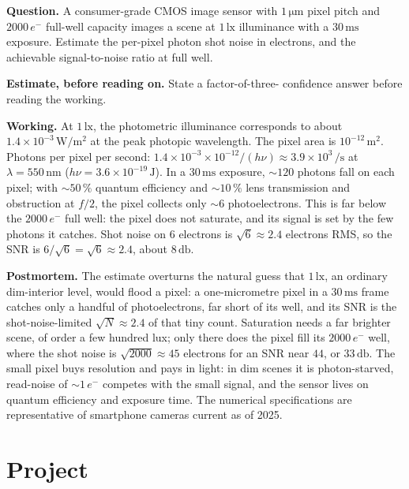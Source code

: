 \begin{estimation}
\textbf{Question.} A consumer-grade CMOS image sensor with $1\,\si{
\micro\meter}$ pixel pitch and $2000\,e^{-}$ full-well capacity
images a scene at $1\,\si{\lux}$ illuminance with a $30\,\si{\milli
\second}$ exposure. Estimate the per-pixel photon shot noise in
electrons, and the achievable signal-to-noise ratio at full well.

\textbf{Estimate, before reading on.} State a factor-of-three-
confidence answer before reading the working.

\textbf{Working.} At $1\,\si{\lux}$, the photometric illuminance
corresponds to about $1.4\times 10^{-3}\,\si{\watt\per\meter
\squared}$ at the peak photopic wavelength. The pixel area is $10^{-12}\,
\si{\meter\squared}$. Photons per pixel per second: $1.4\times 10^{-3}
\times 10^{-12} / (h\nu) \approx 3.9\times 10^{3}\,\si{\per\second}$
at $\lambda = 550\,\si{\nano\meter}$ ($h\nu = 3.6\times 10^{-19}\,\si{
\joule}$). In a $30\,\si{\milli\second}$ exposure, $\sim 120$
photons fall on each pixel; with $\sim 50\,\%$ quantum efficiency and
$\sim 10\,\%$ lens transmission and obstruction at $f/2$, the pixel
collects only $\sim 6$ photoelectrons. This is far below the $2000\,e^{-}$
full well: the pixel does not saturate, and its signal is set by the few
photons it catches. Shot noise on $6$ electrons is $\sqrt{6}\approx 2.4$
electrons RMS, so the SNR is $6/\sqrt{6} = \sqrt{6} \approx 2.4$, about
$8\,\si{\decibel}$.

\textbf{Postmortem.} The estimate overturns the natural guess that
$1\,\si{\lux}$, an ordinary dim-interior level, would flood a pixel:
a one-micrometre pixel in a $30\,\si{\milli\second}$ frame catches only
a handful of photoelectrons, far short of its well, and its SNR is the
shot-noise-limited $\sqrt{N}\approx 2.4$ of that tiny count. Saturation
needs a far brighter scene, of order a few hundred lux; only there does
the pixel fill its $2000\,e^{-}$ well, where the shot noise is
$\sqrt{2000}\approx 45$ electrons for an SNR near $44$, or
$33\,\si{\decibel}$. The small pixel buys resolution and pays in light:
in dim scenes it is photon-starved, read-noise of $\sim 1\,e^{-}$
competes with the small signal, and the sensor lives on quantum
efficiency and exposure time. The numerical specifications are
representative of smartphone cameras current as of 2025.
\end{estimation}

\section{Project}

